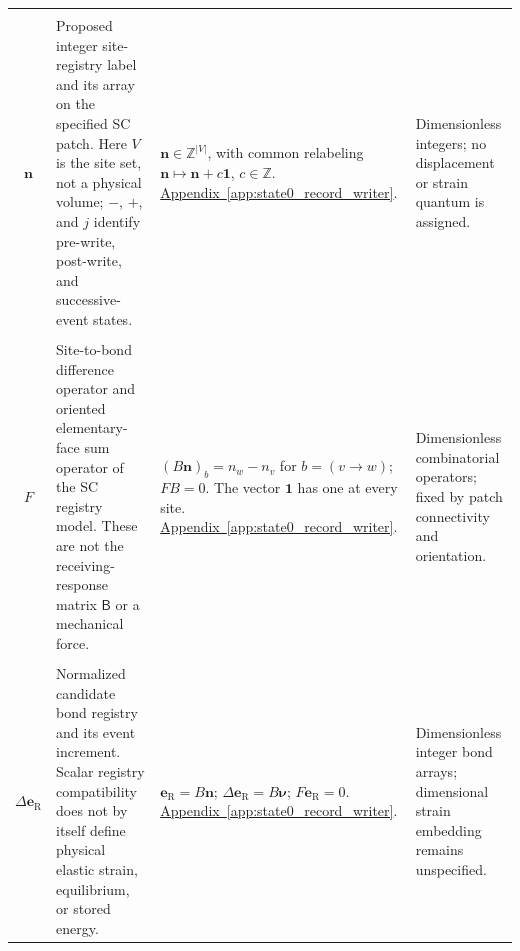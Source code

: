 \begin{longtable}{@{} c p{5.5cm} p{4cm} p{3.5cm} @{}}
\begin{tabular}[c]{@{}c@{}}
    $n_v$ \\
    $\mathbf n$
\end{tabular}
& {\raggedright
Proposed integer site-registry label and its array on the specified
SC patch. Here $V$ is the site set, not a physical volume;
$-$, $+$, and $j$ identify pre-write, post-write,
and successive-event states.
\par}
& {\raggedright
$\mathbf n\in\mathbb Z^{|V|}$, with common relabeling
$\mathbf n\mapsto\mathbf n+c\mathbf 1$, $c\in\mathbb Z$.
\newline
\hyperref[app:state0_record_writer]{Appendix~\ref*{app:state0_record_writer}}.
\par}
& {\raggedright
Dimensionless integers; no displacement or strain quantum is assigned.
\par} \\

\begin{tabular}[c]{@{}c@{}}
    $B$ \\
    $F$
\end{tabular}
& {\raggedright
Site-to-bond difference operator and oriented elementary-face sum
operator of the SC registry model. These are not the
receiving-response matrix $\mathsf B$ or a mechanical force.
\par}
& {\raggedright
$(B\mathbf n)_b=n_w-n_v$ for $b=(v\to w)$; $FB=0$.
The vector $\mathbf 1$ has one at every site.
\newline
\hyperref[app:state0_record_writer]{Appendix~\ref*{app:state0_record_writer}}.
\par}
& {\raggedright
Dimensionless combinatorial operators; fixed by patch connectivity
and orientation.
\par} \\

\begin{tabular}[c]{@{}c@{}}
    $\mathbf e_{\mathrm R}$ \\
    $\Delta\mathbf e_{\mathrm R}$
\end{tabular}
& {\raggedright
Normalized candidate bond registry and its event increment.
Scalar registry compatibility does not by itself define physical
elastic strain, equilibrium, or stored energy.
\par}
& {\raggedright
$\mathbf e_{\mathrm R}=B\mathbf n$;
$\Delta\mathbf e_{\mathrm R}=B\boldsymbol{\nu}$;
$F\mathbf e_{\mathrm R}=0$.
\newline
\hyperref[app:state0_record_writer]{Appendix~\ref*{app:state0_record_writer}}.
\par}
& {\raggedright
Dimensionless integer bond arrays; dimensional strain embedding
remains unspecified.
\par} \\


\end{longtable}
